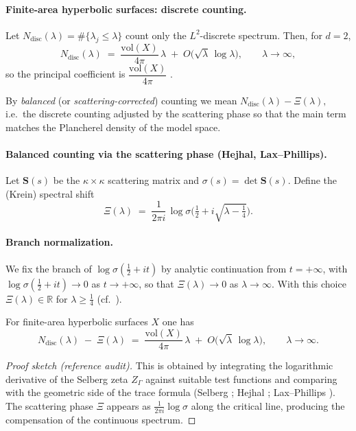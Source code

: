 \paragraph{Finite-area hyperbolic surfaces: discrete counting.}
Let $N_{\mathrm{disc}}(\lambda)=\#\{\lambda_j\le\lambda\}$ count only the $L^2$-discrete spectrum.
Then, for $d=2$,
\[
  N_{\mathrm{disc}}(\lambda)
  \;=\; \frac{\mathrm{vol}(X)}{4\pi}\,\lambda \;+\; O\!\big(\sqrt{\lambda}\,\log\lambda\big),
  \qquad \lambda\to\infty,
\]
so the principal coefficient is $\dfrac{\mathrm{vol}(X)}{4\pi}$ \cite{Selberg1956,Hejhal1983,Hejhal1983II}.

\begin{definition}
By \emph{balanced} (or \emph{scattering-corrected}) counting we mean
\(
  N_{\mathrm{disc}}(\lambda)-\Xi(\lambda),
\)
i.e.\ the discrete counting adjusted by the scattering phase so that the main term matches the Plancherel density of the model space.
\end{definition}

\paragraph{Balanced counting via the scattering phase (Hejhal, Lax--Phillips).}
Let $\mathbf{S}(s)$ be the $\kappa\times\kappa$ scattering matrix and $\sigma(s)=\det\mathbf{S}(s)$.
Define the (Krein) spectral shift
\[
  \Xi(\lambda) \;=\; \frac{1}{2\pi i}\,\log \sigma\!\Big(\tfrac12 + i\sqrt{\lambda - \tfrac14}\Big).
\]

\paragraph{Branch normalization.}
We fix the branch of $\log\sigma(\tfrac12+it)$ by analytic continuation from $t=+\infty$, with $\log\sigma(\tfrac12+it)\to 0$ as $t\to+\infty$, so that $\Xi(\lambda)\to 0$ as $\lambda\to\infty$. With this choice $\Xi(\lambda)\in\mathbb{R}$ for $\lambda\ge\tfrac14$ (cf.\ \cite{Hejhal1983II,LaxPhillips1976}).

\begin{theorem}
\label{thm:balanced-selberg}
For finite-area hyperbolic surfaces $X$ one has
\[
  N_{\mathrm{disc}}(\lambda) \;-\; \Xi(\lambda)
  \;=\; \frac{\mathrm{vol}(X)}{4\pi}\,\lambda \;+\; O\!\big(\sqrt{\lambda}\,\log\lambda\big),
  \qquad \lambda\to\infty.
\]
\end{theorem}

\begin{proof}[Proof sketch (reference audit)]
This is obtained by integrating the logarithmic derivative of the Selberg zeta $Z_\Gamma$ against suitable test functions and comparing with the geometric side of the trace formula (Selberg \cite{Selberg1956}; Hejhal \cite{Hejhal1983,Hejhal1983II}; Lax--Phillips \cite{LaxPhillips1976}). The scattering phase $\Xi$ appears as $\frac{1}{2\pi i}\log \sigma$ along the critical line, producing the compensation of the continuous spectrum.
\end{proof}

